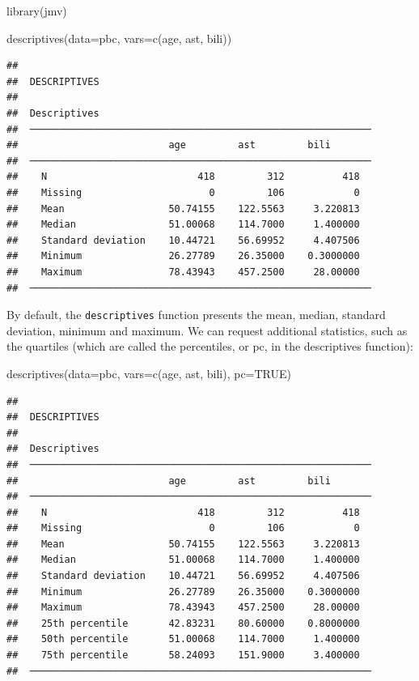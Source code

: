 \documentclass[
]{memoir}
\newenvironment{Shaded}{\begin{snugshade}}{\end{snugshade}}
\newcommand{\AttributeTok}[1]{\textcolor[rgb]{0.77,0.63,0.00}{#1}}
\newcommand{\ConstantTok}[1]{\textcolor[rgb]{0.00,0.00,0.00}{#1}}
\newcommand{\FunctionTok}[1]{\textcolor[rgb]{0.00,0.00,0.00}{#1}}
\newcommand{\NormalTok}[1]{#1}
\begin{document}
\begin{Shaded}
\begin{Highlighting}[]
\FunctionTok{library}\NormalTok{(jmv)}

\FunctionTok{descriptives}\NormalTok{(}\AttributeTok{data=}\NormalTok{pbc, }\AttributeTok{vars=}\FunctionTok{c}\NormalTok{(age, ast, bili))}
\end{Highlighting}
\end{Shaded}

\begin{verbatim}
## 
##  DESCRIPTIVES
## 
##  Descriptives                                                
##  ─────────────────────────────────────────────────────────── 
##                          age         ast         bili        
##  ─────────────────────────────────────────────────────────── 
##    N                          418         312          418   
##    Missing                      0         106            0   
##    Mean                  50.74155    122.5563     3.220813   
##    Median                51.00068    114.7000     1.400000   
##    Standard deviation    10.44721    56.69952     4.407506   
##    Minimum               26.27789    26.35000    0.3000000   
##    Maximum               78.43943    457.2500     28.00000   
##  ───────────────────────────────────────────────────────────
\end{verbatim}

By default, the \texttt{descriptives} function presents the mean, median, standard deviation, minimum and maximum. We can request additional statistics, such as the quartiles (which are called the percentiles, or pc, in the descriptives function):

\begin{Shaded}
\begin{Highlighting}[]
\FunctionTok{descriptives}\NormalTok{(}\AttributeTok{data=}\NormalTok{pbc, }\AttributeTok{vars=}\FunctionTok{c}\NormalTok{(age, ast, bili), }\AttributeTok{pc=}\ConstantTok{TRUE}\NormalTok{)}
\end{Highlighting}
\end{Shaded}

\begin{verbatim}
## 
##  DESCRIPTIVES
## 
##  Descriptives                                                
##  ─────────────────────────────────────────────────────────── 
##                          age         ast         bili        
##  ─────────────────────────────────────────────────────────── 
##    N                          418         312          418   
##    Missing                      0         106            0   
##    Mean                  50.74155    122.5563     3.220813   
##    Median                51.00068    114.7000     1.400000   
##    Standard deviation    10.44721    56.69952     4.407506   
##    Minimum               26.27789    26.35000    0.3000000   
##    Maximum               78.43943    457.2500     28.00000   
##    25th percentile       42.83231    80.60000    0.8000000   
##    50th percentile       51.00068    114.7000     1.400000   
##    75th percentile       58.24093    151.9000     3.400000   
##  ───────────────────────────────────────────────────────────
\end{verbatim}
\end{document}
